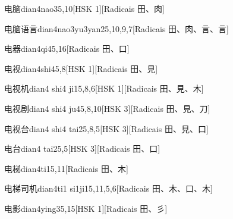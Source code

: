 \begin{entry}{电脑}{dian4nao3}{5,10}[HSK 1][Radicais ⽥、⾁]
\end{entry}

\begin{entry}{电脑语言}{dian4nao3yu3yan2}{5,10,9,7}[Radicais ⽥、⾁、⾔、⾔]
\end{entry}

\begin{entry}{电器}{dian4qi4}{5,16}[Radicais ⽥、⼝]
\end{entry}

\begin{entry}{电视}{dian4shi4}{5,8}[HSK 1][Radicais ⽥、⾒]
\end{entry}

\begin{entry}{电视机}{dian4 shi4 ji1}{5,8,6}[HSK 1][Radicais ⽥、⾒、⽊]
\end{entry}

\begin{entry}{电视剧}{dian4 shi4 ju4}{5,8,10}[HSK 3][Radicais ⽥、⾒、⼑]
\end{entry}

\begin{entry}{电视台}{dian4 shi4 tai2}{5,8,5}[HSK 3][Radicais ⽥、⾒、⼝]
\end{entry}

\begin{entry}{电台}{dian4 tai2}{5,5}[HSK 3][Radicais ⽥、⼝]
\end{entry}

\begin{entry}{电梯}{dian4ti1}{5,11}[Radicais ⽥、⽊]
\end{entry}

\begin{entry}{电梯司机}{dian4ti1 si1ji1}{5,11,5,6}[Radicais ⽥、⽊、⼝、⽊]
\end{entry}

\begin{entry}{电影}{dian4ying3}{5,15}[HSK 1][Radicais ⽥、⼺]
\end{entry}

